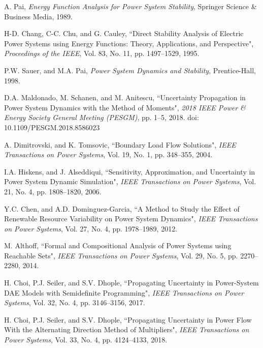 \documentclass[10pt,twocolumn]{IEEEtran}
\begin{document}
\begin{thebibliography}{99}
A. Pai, \emph{Energy Function Analysis for Power System Stability}, Springer Science \& Business Media, 1989.

H-D. Chang, C-C. Chu, and G. Cauley, ``Direct Stability Analysis of Electric Power Systems using Energy Functions: Theory, Applications, and Perspective", \emph{Proceedings of the IEEE}, Vol. 83, No. 11, pp. 1497--1529, 1995.

P.W. Sauer, and M.A. Pai, \emph{Power System Dynamics and Stability}, Prentice-Hall, 1998.


D.A. Maldonado, M. Schanen, and M. Anitescu, ``Uncertainty Propagation in Power System Dynamics with the Method of Moments", \emph{2018 IEEE Power \& Energy Society General Meeting (PESGM)}, pp. 1--5, 2018. doi: 10.1109/PESGM.2018.8586023
 


A. Dimitrovski, and K. Tomsovic, ``Boundary Load Flow Solutions", \emph{IEEE Transactions on Power Systems}, Vol. 19, No. 1, pp. 348--355, 2004.

I.A. Hiskens, and J. Alseddiqui, ``Sensitivity, Approximation, and Uncertainty in Power System Dynamic Simulation", \emph{IEEE Transactions on Power Systems}, Vol. 21, No. 4, pp. 1808--1820, 2006. 

Y.C. Chen, and A.D. Dominguez-Garcia, ``A Method to Study the Effect of Renewable Resource Variability on Power System Dynamics", \emph{IEEE Transactions on Power Systems}, Vol. 27, No. 4, pp. 1978--1989, 2012.

M. Althoff, ``Formal and Compositional Analysis of Power Systems using Reachable Sets", \emph{IEEE Transactions on Power Systems}, Vol. 29, No. 5, pp. 2270--2280, 2014. 

H. Choi, P.J. Seiler, and S.V. Dhople, ``Propagating Uncertainty in Power-System DAE Models with Semidefinite Programming", \emph{IEEE Transactions on Power Systems}, Vol. 32, No. 4, pp. 3146--3156, 2017.

H. Choi, P.J. Seiler, and S.V. Dhople, ``Propagating Uncertainty in Power Flow With the Alternating Direction Method of Multipliers", \emph{IEEE Transactions on Power Systems}, Vol. 33, No. 4, pp. 4124--4133, 2018.


\end{thebibliography}
\end{document}
